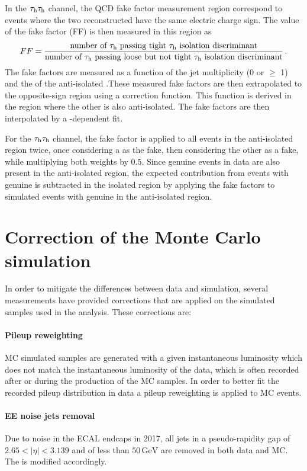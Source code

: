 In the $\tau_{\rm h}\tau_{\rm h}$ channel, the QCD fake factor measurement region correspond to events where the two reconstructed \tauh have the same electric charge sign. The value of the fake factor (FF) is then measured in this region as
\begin{equation}
    FF = \frac{\text{number of \tauh passing tight \tauh isolation discriminant}}{\text{number of \tauh passing loose but not tight \tauh isolation discriminant}} \mend
\end{equation}
The fake factors are measured as a function of the jet multiplicity (0 or $\geq$ 1) and the \pt of the anti-isolated \tauh.These measured fake factors are then extrapolated to the opposite-sign region using a correction function. This function is derived in the region where the other \tauh is also anti-isolated.  The fake factors are then interpolated by a \pt-dependent fit.

For the $\tau_{\rm h}\tau_{\rm h}$ channel, the fake factor is applied to all events in the anti-isolated region twice, once considering a \tauh as the fake, then considering the other as a fake, while multiplying both weights by $0.5$. Since genuine \tauh events in data are also present in the anti-isolated region, the expected contribution from events with genuine \tauh is subtracted in the isolated region by applying the fake factors to simulated events with genuine \tauh in the anti-isolated region.


\section{Correction of the Monte Carlo simulation}
\label{sec:MC_corr}

In order to mitigate the differences between data and simulation, several measurements have provided corrections that are applied on the simulated samples used in the analysis. These corrections are:

\paragraph{Pileup reweighting} MC simulated samples are generated with a given instantaneous luminosity which does not match the instantaneous luminosity of the data, which is often recorded after or during the production of the MC samples. In order to better fit the recorded pileup distribution in data a pileup reweighting is applied to MC events.

\paragraph{EE noise jets removal} Due to noise in the ECAL endcaps in 2017, all jets in a pseudo-rapidity gap of $2.65 < |\eta| < 3.139$ and of less than $50 \,\mathrm{GeV}$ are removed in both data and MC. The \MET is modified accordingly.

